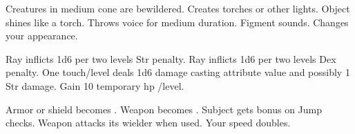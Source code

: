 \begin{swspelllist}
 Creatures in medium cone are bewildered.
 Creates torches or other lights.
 Object shines like a torch.
 Throws voice for medium duration.
 Figment sounds.
 Changes your appearance.

 Ray inflicts 1d6  per two levels Str penalty.
 Ray inflicts 1d6  per two levels Dex penalty.
 One touch/level deals 1d6 damage \add casting attribute value and possibly 1 Str damage.
 Gain 10 temporary hp /level.

 Armor or shield becomes .
 Weapon becomes .
 Subject gets bonus on Jump checks.
 Weapon attacks its wielder when used.
 Your speed doubles.
\end{swspelllist}

